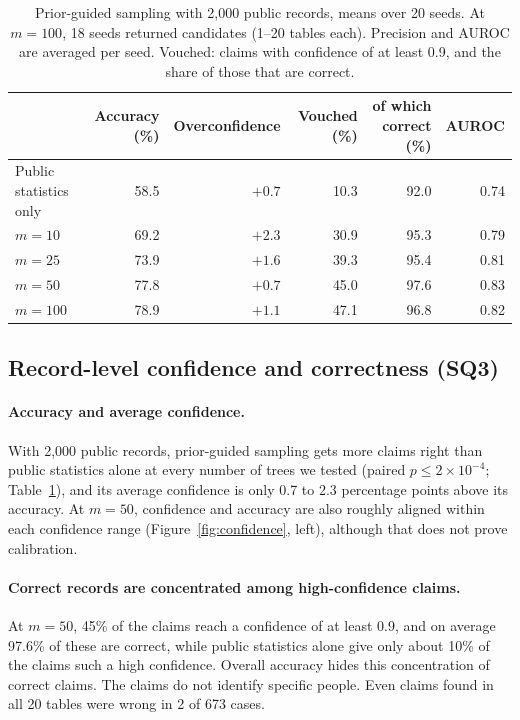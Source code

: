 \begin{table}[t]
  \centering
  \caption{Prior-guided sampling with 2,000 public records, means over 20 seeds.
      At $m=100$, 18 seeds returned candidates (1--20 tables each). Precision and AUROC
      are averaged per seed. Vouched: claims with confidence of at least 0.9, and the share
      of those that are correct.}
  \label{tab:confidence}
  \small
  \setlength{\tabcolsep}{4.5pt}
  \begin{tabular}{lrrrrr}
    \toprule
    & Accuracy (\%) & Overconfidence & Vouched (\%) & of which correct (\%) & AUROC \\
    \midrule
    Public statistics only & 58.5 & $+0.7$ & 10.3 & 92.0 & 0.74 \\
    $m=10$ & 69.2 & $+2.3$ & 30.9 & 95.3 & 0.79 \\
    $m=25$ & 73.9 & $+1.6$ & 39.3 & 95.4 & 0.81 \\
    $m=50$ & 77.8 & $+0.7$ & 45.0 & 97.6 & 0.83 \\
    $m=100$ & 78.9 & $+1.1$ & 47.1 & 96.8 & 0.82 \\
    \bottomrule
  \end{tabular}
\end{table}

\subsection{Record-level confidence and correctness (SQ3)}
\paragraph{Accuracy and average confidence.} With 2,000 public records, prior-guided sampling
  gets more claims right than public statistics alone at every number of trees we tested
  (paired $p\leq2\times10^{-4}$; Table~\ref{tab:confidence}), and its average confidence is
  only 0.7 to 2.3 percentage points above its accuracy. At $m=50$, confidence and accuracy are also roughly aligned within each confidence
  range (Figure~\ref{fig:confidence}, left), although that does not prove calibration.

\paragraph{Correct records are concentrated among high-confidence claims.} At $m=50$, 45\% of the claims reach a confidence of at least 0.9, and
  on average 97.6\% of these are correct, while public statistics alone give only about 10\%
  of the claims such a high confidence. Overall accuracy hides this concentration of correct claims. The claims do not identify
  specific people.
  Even claims found in all 20 tables were wrong in 2 of 673 cases.

